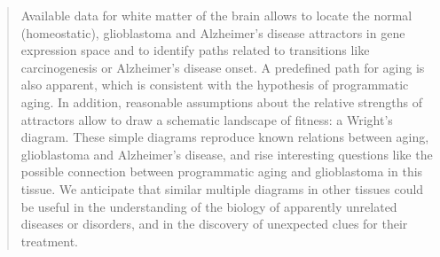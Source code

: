 \begin{quote}

{\large Available data for white matter of the brain allows to locate the normal (homeostatic), glioblastoma and Alzheimer’s disease attractors in gene expression space and to identify paths related to transitions like carcinogenesis or Alzheimer’s disease onset. A predefined path for aging is also apparent, which is consistent with the hypothesis of programmatic aging. In addition, reasonable assumptions about the relative strengths of attractors allow to draw a schematic landscape of fitness: a Wright’s diagram. These simple diagrams reproduce known relations between aging, glioblastoma and Alzheimer’s disease, and rise interesting questions like the possible connection between programmatic aging and glioblastoma in this tissue. We anticipate that similar multiple diagrams in other tissues could be useful in the understanding of the biology of apparently unrelated diseases or disorders, and in the discovery of unexpected clues for their treatment.
}


\end{quote}

\vfill
\cleardoublepage
